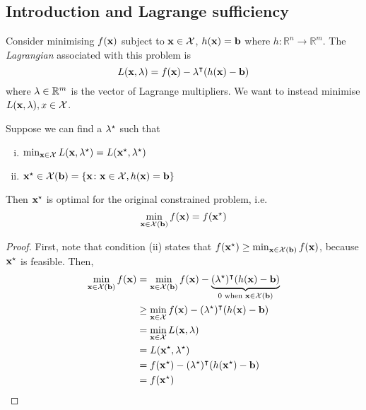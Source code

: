\subsection{Introduction and Lagrange sufficiency}
Consider minimising \(f(\vb x)\) subject to \(\vb x \in \mathcal X\), \(h(\vb x) = \vb b\) where \(h \colon \mathbb R^n \to \mathbb R^m\).
The \textit{Lagrangian} associated with this problem is
\[
	L(\vb x, \vb \lambda) = f(\vb x) - \vb \lambda^\intercal(h(\vb x) - \vb b)
\]
where \(\vb\lambda \in \mathbb R^m\) is the vector of Lagrange multipliers.
We want to instead minimise \(L(\vb x, \vb \lambda), x \in \mathcal X\).
\begin{theorem}
	Suppose we can find a \(\vb \lambda^\star\) such that
	\begin{enumerate}[(i)]
		\item \(\min_{\vb x \in \mathcal X} L(\vb x, \vb \lambda^\star) = L(\vb x^\star, \vb\lambda^\star)\)
		\item \(\vb x^\star \in \mathcal X(\vb b) = \qty{\vb x \colon \vb x \in \mathcal X, h(\vb x) = \vb b}\)
	\end{enumerate}
	Then \(\vb x^\star\) is optimal for the original constrained problem, i.e.
	\[
		\min_{\vb x \in \mathcal X(\vb b)} f(\vb x) = f(\vb x^\star)
	\]
\end{theorem}
\begin{proof}
	First, note that condition (ii) states that \(f(\vb x^\star) \geq \min_{\vb x \in \mathcal X(\vb b)}f(\vb x)\), because \(\vb x^\star\) is feasible.
	Then,
	\begin{align*}
		\min_{\vb x \in \mathcal X(\vb b)}f(\vb x) & = \min_{\vb x \in \mathcal X(\vb b)} f(\vb x) - \underbrace{(\vb\lambda^\star)^\intercal (h(\vb x) - \vb b)}_{0 \text{ when } \vb x \in \mathcal X(\vb b)} \\
		                                           & \geq \min_{\vb x \in \mathcal X} f(\vb x) - (\vb\lambda^\star)^\intercal (h(\vb x) - \vb b)                                                                \\
		                                           & = \min_{\vb x \in \mathcal X} L(\vb x, \vb \lambda)                                                                                                         \\
		                                           & = L(\vb x^\star, \vb \lambda^\star)                                                                                                                         \\
		                                           & = f(\vb x^\star) - (\vb\lambda^\star)^\intercal (h(\vb x^\star) - \vb b)                                                                                   \\
		                                           & = f(\vb x^\star)
	\end{align*}
\end{proof}

